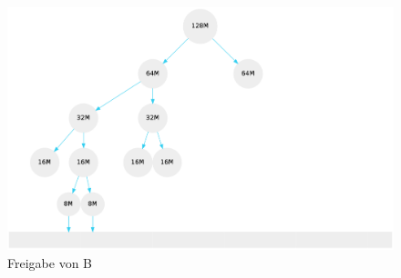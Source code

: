 \documentclass[11pt, a4paper]{scrartcl}
\begin{document}
\begin{figure}[H]
\center
\includegraphics[scale=0.32]{a1_6}
\caption{Freigabe von B}
\end{figure} 	


\end{document}
